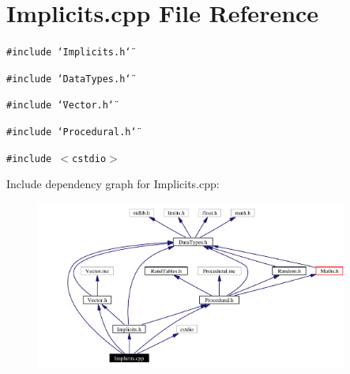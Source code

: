 \section{Implicits.cpp File Reference}
\label{Implicits_8cpp}
{\tt \#include \char`\"{}Implicits.h\char`\"{}}\par
{\tt \#include \char`\"{}Data\-Types.h\char`\"{}}\par
{\tt \#include \char`\"{}Vector.h\char`\"{}}\par
{\tt \#include \char`\"{}Procedural.h\char`\"{}}\par
{\tt \#include $<$cstdio$>$}\par


Include dependency graph for Implicits.cpp:\begin{figure}[H]
\begin{center}
\leavevmode
\includegraphics[width=290pt]{Implicits_8cpp__incl}
\end{center}
\end{figure}
